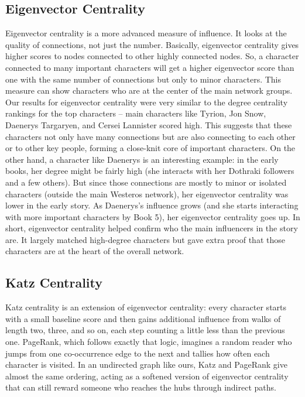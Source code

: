 \documentclass[12pt, a4paper]{article}
\begin{document}
\subsection*{Eigenvector Centrality}
Eigenvector centrality is a more advanced measure of influence. It looks at the quality of connections, not just the number. Basically, eigenvector centrality gives higher scores to nodes connected to other highly connected nodes. So, a character connected to many important characters will get a higher eigenvector score than one with the same number of connections but only to minor characters. This measure can show characters who are at the center of the main network groups. Our results for eigenvector centrality were very similar to the degree centrality rankings for the top characters – main characters like Tyrion, Jon Snow, Daenerys Targaryen, and Cersei Lannister scored high. This suggests that these characters not only have many connections but are also connecting to each other or to other key people, forming a close-knit core of important characters. On the other hand, a character like Daenerys is an interesting example: in the early books, her degree might be fairly high (she interacts with her Dothraki followers and a few others). But since those connections are mostly to minor or isolated characters (outside the main Westeros network), her eigenvector centrality was lower in the early story. As Daenerys's influence grows (and she starts interacting with more important characters by Book 5), her eigenvector centrality goes up. In short, eigenvector centrality helped confirm who the main influencers in the story are. It largely matched high-degree characters but gave extra proof that those characters are at the heart of the overall network.

\subsection*{Katz Centrality}
Katz centrality is an extension of eigenvector centrality: every character starts with a small baseline score and then gains additional influence from walks of length two, three, and so on, each step counting a little less than the previous one. PageRank, which follows exactly that logic, imagines a random reader who jumps from one co-occurrence edge to the next and tallies how often each character is visited. In an undirected graph like ours, Katz and PageRank give almost the same ordering, acting as a softened version of eigenvector centrality that can still reward someone who reaches the hubs through indirect paths.
\end{document}
